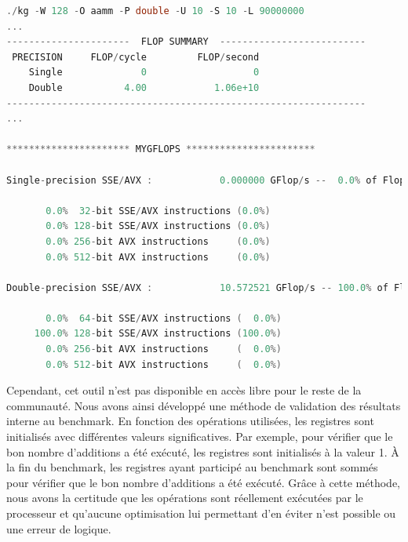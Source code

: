 \begin{lstlisting}[label=lst:basic_gflops ,language=C, caption=Validation des résultats donnés par le benchmark grâce à l'outil \textit{mygflops}.]
./kg -W 128 -O aamm -P double -U 10 -S 10 -L 90000000
...
----------------------  FLOP SUMMARY  --------------------------
 PRECISION     FLOP/cycle         FLOP/second
    Single              0                   0
    Double           4.00            1.06e+10
----------------------------------------------------------------
...

********************** MYGFLOPS ***********************
     
Single-precision SSE/AVX :            0.000000 GFlop/s --  0.0% of Flops

       0.0%  32-bit SSE/AVX instructions (0.0%)
       0.0% 128-bit SSE/AVX instructions (0.0%)
       0.0% 256-bit AVX instructions     (0.0%)
       0.0% 512-bit AVX instructions     (0.0%)
     
Double-precision SSE/AVX :            10.572521 GFlop/s -- 100.0% of Flops

       0.0%  64-bit SSE/AVX instructions (  0.0%)
     100.0% 128-bit SSE/AVX instructions (100.0%)
       0.0% 256-bit AVX instructions     (  0.0%)
       0.0% 512-bit AVX instructions     (  0.0%)

\end{lstlisting}
        
        Cependant, cet outil n'est pas disponible en accès libre pour le reste de la communauté. Nous avons ainsi développé une méthode de validation des résultats interne au benchmark. En fonction des opérations utilisées, les registres sont initialisés avec différentes valeurs significatives. Par exemple, pour vérifier que le bon nombre d'additions a été exécuté, les registres sont initialisés à la valeur 1. À la fin du benchmark, les registres ayant participé au benchmark sont sommés pour vérifier que le bon nombre d'additions a été exécuté. Grâce à cette méthode, nous avons la certitude que les opérations sont réellement exécutées par le processeur et qu'aucune optimisation lui permettant d'en éviter n'est possible ou une erreur de logique.
        

    
